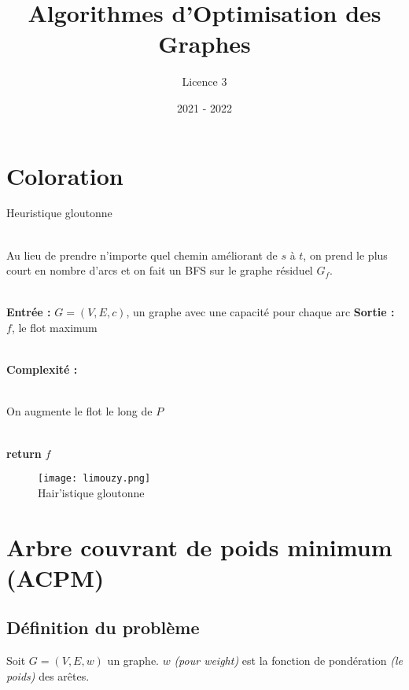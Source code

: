 \documentclass{article}      %
\title{Algorithmes d'Optimisation des Graphes}
\author{Licence 3}
\date{2021 - 2022}
\begin{document}
\normalsize
\maketitle

\renewcommand*\contentsname{Table des matières}
\tableofcontents
\newpage

\section{Coloration}
\begin{algorithm}[H] \caption{Heuristique gloutonne}
\begin{algorithmic}

\\ \State Au lieu de prendre n’importe quel chemin améliorant de $s$ à $t$, on prend le plus court en nombre d’arcs et on fait un BFS sur le graphe résiduel $G_f$.

\\ \State \textbf{Entrée :} $G = (V, E, c)$, un graphe avec une capacité pour chaque arc
\State \textbf{Sortie :} $f$, le flot maximum

\\ \State \textbf{Complexité :} %

\\ 
    \State On augmente le flot le long de $P$
\EndWhile

\\ \State \textbf{return} $f$
\end{algorithmic}
\end{algorithm}

\begin{figure}[H]
    \centering
    \texttt{[image: limouzy.png]}
    \\Hair'istique gloutonne
\end{figure}

\section{Arbre couvrant de poids minimum (ACPM)}

\subsection{Définition du problème}
Soit $G = (V, E, w)$ un graphe.
$w$ \textit{(pour weight)} est la fonction de pondération \textit{(le poids)} des arêtes.
\end{document}
